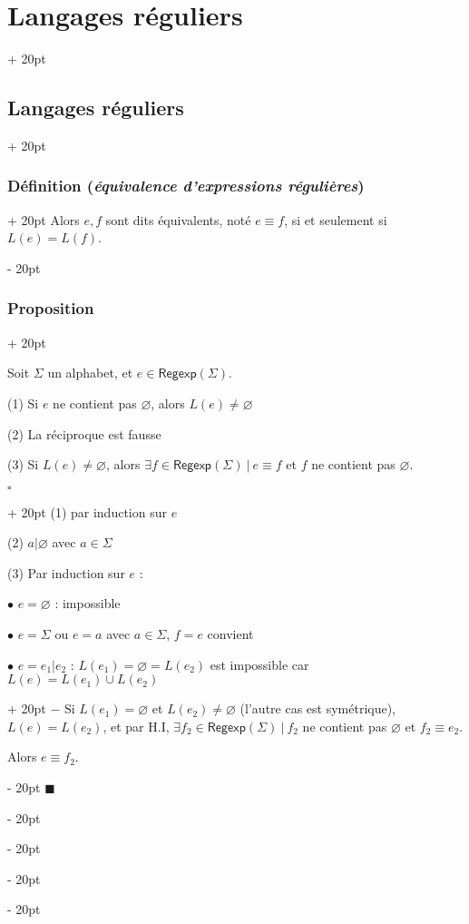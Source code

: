 \documentclass[a4paper, 12pt, twoside]{article}
\newcommand{\ind}[1][20pt]{\advance\leftskip + #1}
\newcommand{\deind}[1][20pt]{\advance\leftskip - #1}
\newenvironment{indt}[2][20pt]{#2 \par \ind[#1]}{\par \deind} %
\newenvironment{proof}[1][{}]{\begin{indt}{$\square$ #1}}{$\blacksquare$ \end{indt}}
\newcommand{\Regexp}{\mathsf{Regexp}}
\begin{document}
\begin{indt}{\section{Langages réguliers}}
\begin{indt}{\subsection{Langages réguliers}}
\begin{indt}{\subsubsection{Définition (\textit{équivalence d'expressions régulières})}}
                Alors $e, f$ sont dits équivalents, noté $e \equiv f$, si et seulement si $L(e) = L(f)$.
            \end{indt}

            \vspace{12pt}
            
            \begin{indt}{\subsubsection{Proposition}}
                \begin{emphBox}
                    Soit $\Sigma$ un alphabet, et $e \in \Regexp(\Sigma)$.

                    (1) Si $e$ ne contient pas $\varnothing$, alors $L(e) \neq \varnothing$

                    (2) La réciproque est fausse

                    (3) Si $L(e) \neq \varnothing$, alors $\exists f \in \Regexp(\Sigma)\ |\ e \equiv f$ et $f$ ne contient pas $\varnothing$.
                \end{emphBox}

                \vspace{12pt}
                
                \begin{proof}
                    (1)  par induction sur $e$

                    (2) $a | \varnothing$ avec $a \in \Sigma$

                    (3) Par induction sur $e$ :

                    $\bullet$ $e = \varnothing$ : impossible

                    $\bullet$ $e = \Sigma$ ou $e = a$ avec $a \in \Sigma$, $f = e$ convient

                    \begin{indt}{$\bullet$ $e = e_1 | e_2$ : $L(e_1) = \varnothing = L(e_2)$ est impossible car $L(e) = L(e_1) \cup L(e_2)$}
                        $-$ Si $L(e_1) = \varnothing$ et $L(e_2) \neq \varnothing$ (l'autre cas est symétrique), $L(e) = L(e_2)$, et par H.I, $\exists f_2 \in \Regexp(\Sigma)\ |\ f_2$ ne contient pas $\varnothing$ et $f_2 \equiv e_2$.

                        Alors $e \equiv f_2$.

                        \vspace{12pt}
                        

\end{indt}
\end{proof}
\end{indt}
\end{indt}
\end{indt}
\end{document}
